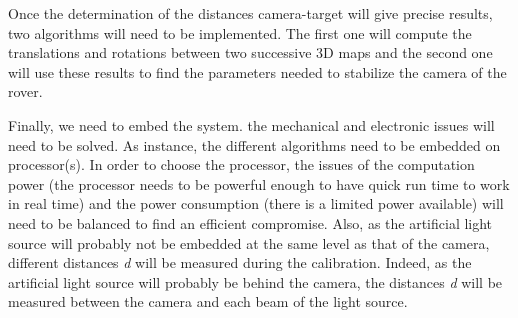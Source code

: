 Once the determination of the distances camera-target will give precise results, two algorithms will need to be implemented. The first one will compute the translations and rotations between two successive 3D maps and the second one will use these results to find the parameters needed to stabilize the camera of the rover.

Finally, we need to embed the system. the mechanical and electronic issues will need to be solved. As instance, the different algorithms need to be embedded on processor(s). In order to choose the processor, the issues of the computation power (the processor needs to be powerful enough to have quick run time to work in real time) and the power consumption (there is a limited power available) will need to be balanced to find an efficient compromise. Also, as the artificial light source will probably not be embedded at the same level as that of the camera, different distances \emph{d} will be measured during the calibration. Indeed, as the artificial light source will probably be behind the camera, the distances \emph{d} will be measured between the camera and each beam of the light source.









